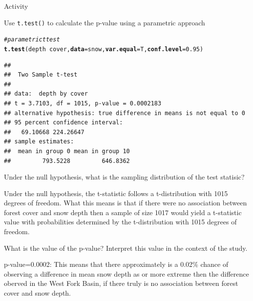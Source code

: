 \documentclass[12pt]{article}\usepackage[]{graphicx}\usepackage[]{color}
\makeatletter
\newcommand{\hlnum}[1]{\textcolor[rgb]{0,0,0}{#1}}%
\newcommand{\hlcom}[1]{\textcolor[rgb]{0.4,0.4,0.4}{\textit{#1}}}%
\newcommand{\hlopt}[1]{\textcolor[rgb]{0,0,0}{\textbf{#1}}}%
\newcommand{\hlstd}[1]{\textcolor[rgb]{0,0,0}{#1}}%
\newcommand{\hlkwc}[1]{\textcolor[rgb]{0,0,0}{\textbf{#1}}}%
\newcommand{\hlkwd}[1]{\textcolor[rgb]{0,0,0}{\textbf{#1}}}%
\newenvironment{kframe}{%
 \def\at@end@of@kframe{}%
 \ifinner\ifhmode%
  \def\at@end@of@kframe{\end{minipage}}%
  \begin{minipage}{\columnwidth}%
 \fi\fi%
 \def\FrameCommand##1{\hskip\@totalleftmargin \hskip-\fboxsep
 \colorbox{shadecolor}{##1}\hskip-\fboxsep
     \hskip-\linewidth \hskip-\@totalleftmargin \hskip\columnwidth}%
 \MakeFramed {\advance\hsize-\width
   \@totalleftmargin\z@ \linewidth\hsize
   \@setminipage}}%
 {\par\unskip\endMakeFramed%
 \at@end@of@kframe}
\newenvironment{knitrout}{}{} %
\renewenvironment{knitrout}{\begin{footnotesize}}{\end{footnotesize}}
\makeatother
\begin{document}
\begin{exam}{Activity}
\begin{problem*}
Use {\tt t.test()} to calculate the p-value using a parametric approach
\begin{knitrout}\footnotesize
{}\color{fgcolor}\begin{kframe}
\begin{alltt}
\hlcom{# parametric t test}
\hlkwd{t.test}\hlstd{(depth} \hlopt{~} \hlstd{cover,} \hlkwc{data} \hlstd{= snow,} \hlkwc{var.equal} \hlstd{= T,} \hlkwc{conf.level} \hlstd{=} \hlnum{0.95}\hlstd{)}
\end{alltt}
\begin{verbatim}
## 
## 	Two Sample t-test
## 
## data:  depth by cover
## t = 3.7103, df = 1015, p-value = 0.0002183
## alternative hypothesis: true difference in means is not equal to 0
## 95 percent confidence interval:
##   69.10668 224.26647
## sample estimates:
##  mean in group 0 mean in group 10 
##         793.5228         646.8362
\end{verbatim}
\end{kframe}
\end{knitrout}
\begin{parts}
  \item Under the null hypothesis, what is the sampling distribution of the test statisic?
  \begin{solution}[2cm]
Under the null hypothesis, the t-statistic follows a t-distribution with 1015 degrees of freedom. What this means is that if there were no association between forest cover and snow depth then a sample of size 1017 would yield a t-statistic value with probabilities determined by the t-distribution with 1015 degrees of freedom.
\end{solution}

\item What is the value of the p-value? Interpret this value in the context of the study.
\begin{solution}[2cm]
p-value=0.0002: This means that there approximately is a 0.02\% chance of observing a difference in mean snow depth as or more extreme then the difference oberved in the West Fork Basin, if there truly is no association between forest cover and snow depth.
\end{solution}
\end{parts}
\end{problem*}



\end{exam}
\end{document}
